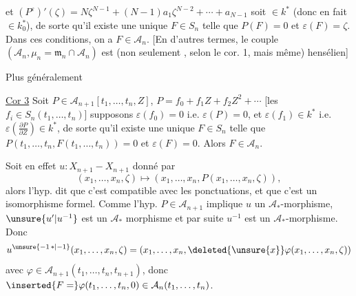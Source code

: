 et $(P^\varepsilon)'(\zeta)=N\zeta^{N-1}+(N-1)a_1\zeta^{N-2}+\cdots+a_{N-1}$ soit $\in k^*$ (donc en fait $\in k_0^*$), de sorte qu'il existe une unique $F\in S_n$ telle que $P(F)=0$ et $\varepsilon(F)=\zeta$. Dans ces conditions, on a $F\in \mathcal A_n$. [En d'autres termes, le couple $(\mathcal A_n,\mu_n=\mathfrak m_n\cap \mathcal A_n)$ est (non seulement , selon le cor. 1, mais même) hensélien]


Plus généralement

\uline{Cor 3} Soit $P\in \mathcal A_{n+1}[t_1,\ldots,t_n,Z]$, $P=f_0+f_1Z+f_2Z^2+\cdots$ [les $f_i\in S_n(t_1,\ldots,t_n)$] supposons $\varepsilon(f_0)=0$ i.e. $\varepsilon(P)=0$, et $\varepsilon(f_1)\in k^*$ i.e. $\varepsilon\left(\frac{\partial P}{\partial Z}\right)\in k^*$, de sorte qu'il existe une unique $F\in S_n$ telle que $P(t_1,\ldots,t_n,F(t_1,\ldots,t_n))=0$ et $\varepsilon(F)=0$. Alors $F\in \mathcal A_n$.

Soit en effet $u:X_{n+1}\mathbin{-}X_{n+1}$ donné par
\[
(x_1,\ldots,x_n,\zeta)\longmapsto(x_1,\ldots,x_n,P(x_1,\ldots,x_n,\zeta)),
\]
alors l'hyp. dit que c'est compatible avec les ponctuations, et que c'est un isomorphisme formel. Comme l'hyp. $P\in \mathcal A_{n+1}$ implique $u$ un $\mathcal A_*$-morphisme, $\unsure{u'|u^{-1}}$ est un $\mathcal A_*$ morphisme et par suite $u^{-1}$ est un $\mathcal A_*$-morphisme. Donc
\[
u^{\unsure{-1\,*|-1}}(x_1,\ldots,x_n,\zeta)=(x_1,\ldots,x_n,\deleted{\unsure{x}}\varphi(x_1,\ldots,x_n,\zeta))
\]
avec $\varphi\in \mathcal A_{n+1}(t_1,\ldots,t_n,t_{n+1})$, donc $\inserted{F=}\varphi(t_1,\ldots,t_n,0)\in \mathcal A_n(t_1,\ldots,t_n)$.


